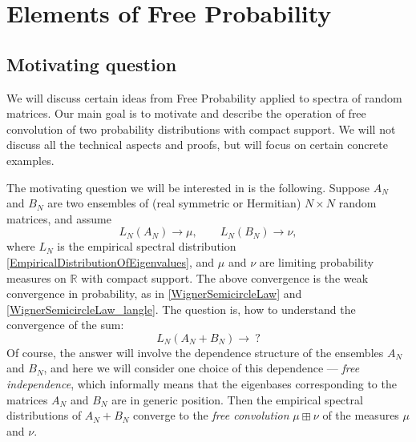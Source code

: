 \documentclass[letterpaper,11pt,oneside,reqno]{amsart}
\numberwithin{equation}{section}
\newcounter{lecture}
\newcommand{\lect}[1]{\bigskip\addtocounter{lecture}{1}\noindent{\Large{\color{red}\bf{}Lecture \#\arabic{lecture} on #1 \hrulefill}}}
\theoremstyle{definition}
\begin{document}


\lect{2/1/2016}

\section{Elements of Free Probability} %
\label{sec:elements_of_free_probability}

\subsection{Motivating question} %
\label{sub:motivation}

We will discuss certain ideas from Free Probability
applied to spectra of random matrices. 
Our main goal is to motivate and describe the operation of free convolution
of two probability distributions with compact support. 
We will not discuss all the technical aspects and proofs, but will focus on 
certain concrete examples.

The motivating question we will be interested in is the following. Suppose
$A_N$ and $B_N$ are two ensembles of 
(real symmetric or Hermitian) $N\times N$ random matrices, and 
assume
\begin{equation*}
	L_N(A_N)\to\mu,\qquad L_N(B_N)\to\nu,
\end{equation*}
where $L_N$ is the empirical spectral distribution \eqref{EmpiricalDistributionOfEigenvalues}, and $\mu$ and $\nu$ are limiting probability measures on $\mathbb{R}$ with compact support.
The above convergence is the weak convergence in probability, as in 
\eqref{WignerSemicircleLaw} and \eqref{WignerSemicircleLaw_langle}.
The question is, how to understand the convergence of the sum:
\begin{equation*}
	L_N(A_N+B_N)\to\ ?
\end{equation*}
Of course, the answer will involve the dependence structure
of the ensembles $A_N$ and $B_N$, and here we will consider 
one choice of this dependence --- \emph{free independence},
which informally means that the eigenbases corresponding to the matrices
$A_N$ and $B_N$ are in generic position.
Then the empirical spectral distributions of $A_N+B_N$
converge to the \emph{free convolution}
$\mu\boxplus\nu$ of the measures $\mu$ and $\nu$.
\end{document}
